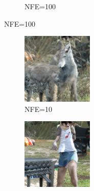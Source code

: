 \documentclass{article}
\begin{document}
\begin{figure}
\begin{subfigure}[b]{0.5\linewidth}
\begin{subfigure}[b]{0.242\linewidth}
        \caption*{NFE=100}
        \end{subfigure}
        \hfill
    \end{subfigure}%
    \begin{subfigure}[b]{0.5\linewidth}
        \begin{subfigure}[b]{0.242\linewidth}
        \includegraphics[width=\linewidth]{figures/imagenet128/solver_samples/imagenet128_fm_ot_395_05.png}
        \caption*{NFE=10}
        \end{subfigure}
        \begin{subfigure}[b]{0.242\linewidth}
        \includegraphics[width=\linewidth]{figures/imagenet128/solver_samples/imagenet128_fm_ot_395_10.png}

\end{subfigure}
\end{subfigure}
\end{figure}
\end{document}
